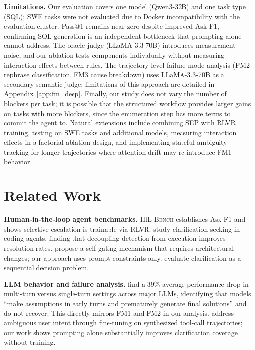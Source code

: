 \documentclass{article} %
\newcommand{\hilbench}{\textsc{HIL-Bench}}
\newcommand{\oursystem}{SEP} %
\begin{document}
\textbf{Limitations.}
Our evaluation covers one model (Qwen3-32B) and one task type (SQL); SWE tasks were not
evaluated due to Docker incompatibility with the evaluation cluster.
Pass@1 remains near zero despite improved Ask-F1, confirming SQL generation is an
independent bottleneck that prompting alone cannot address.
The oracle judge (LLaMA-3.3-70B) introduces measurement noise, and our ablation
tests components individually without measuring interaction effects between rules.
The trajectory-level failure mode analysis (FM2 rephrase classification, FM3 cause
breakdown) uses LLaMA-3.3-70B as a secondary semantic judge; limitations of this
approach are detailed in Appendix~\ref{app:fm_deep}.
Finally, our study does not vary the number of blockers per task; it is possible that
the structured workflow provides larger gains on tasks with more blockers, since the
enumeration step has more terms to commit the agent to.
Natural extensions include combining \oursystem{} with RLVR training, testing on SWE
tasks and additional models, measuring interaction effects in a factorial ablation design,
and implementing stateful ambiguity tracking for longer trajectories where attention
drift may re-introduce FM1 behavior.

\section{Related Work}
\label{sec:related}

\textbf{Human-in-the-loop agent benchmarks.}
\hilbench{} \citep{hilbench2025} establishes Ask-F1 and shows selective escalation is
trainable via RLVR.
\citet{askorask2025} study clarification-seeking in coding agents, finding that decoupling
detection from execution improves resolution rates.
\citet{selfgated2025} propose a self-gating mechanism that requires architectural changes;
our approach uses prompt constraints only.
\citet{regretbench2025} evaluate clarification as a sequential decision problem.

\textbf{LLM behavior and failure analysis.}
\citet{llmslost2025} find a 39\% average performance drop in multi-turn versus
single-turn settings across major LLMs, identifying that models ``make assumptions in
early turns and prematurely generate final solutions'' and do not recover.
This directly mirrors FM1 and FM2 in our analysis.
\citet{trajectory2task2026} address ambiguous user intent through fine-tuning on
synthesized tool-call trajectories; our work shows prompting alone substantially
improves clarification coverage without training.
\end{document}
